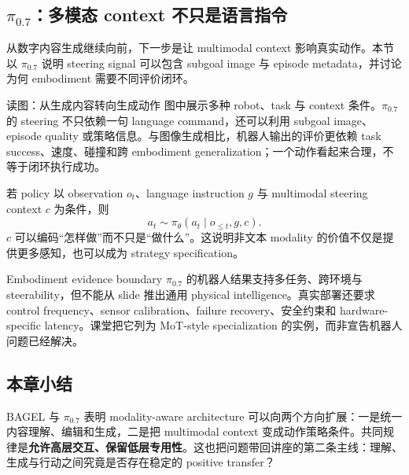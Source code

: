 \subsection{\texorpdfstring{$\pi_{0.7}$}{pi0.7}：多模态 context 不只是语言指令}

从数字内容生成继续向前，下一步是让 multimodal context 影响真实动作。本节以 $\pi_{0.7}$ 说明 steering signal 可以包含 subgoal image 与 episode metadata，并讨论为何 embodiment 需要不同评价闭环。


\begin{knowledgebox}{读图：从生成内容转向生成动作}
图中展示多种 robot、task 与 context 条件。$\pi_{0.7}$ 的 steering 不只依赖一句 language command，还可以利用 subgoal image、episode quality 或策略信息。与图像生成相比，机器人输出的评价更依赖 task success、速度、碰撞和跨 embodiment generalization；一个动作看起来合理，不等于闭环执行成功。
\end{knowledgebox}

若 policy 以 observation $o_t$、language instruction $g$ 与 multimodal steering context $c$ 为条件，则
$$
a_t\sim\pi_\theta(a_t\mid o_{\le t},g,c).
$$
$c$ 可以编码“怎样做”而不只是“做什么”。这说明非文本 modality 的价值不仅是提供更多感知，也可以成为 strategy specification。

\begin{warningbox}{Embodiment evidence boundary}
$\pi_{0.7}$ 的机器人结果支持多任务、跨环境与 steerability，但不能从 slide 推出通用 physical intelligence。真实部署还要求 control frequency、sensor calibration、failure recovery、安全约束和 hardware-specific latency。课堂把它列为 MoT-style specialization 的实例，而非宣告机器人问题已经解决。
\end{warningbox}

\subsection{本章小结}

BAGEL 与 $\pi_{0.7}$ 表明 modality-aware architecture 可以向两个方向扩展：一是统一内容理解、编辑和生成，二是把 multimodal context 变成动作策略条件。共同规律是\textbf{允许高层交互、保留低层专用性}。这也把问题带回讲座的第二条主线：理解、生成与行动之间究竟是否存在稳定的 positive transfer？

